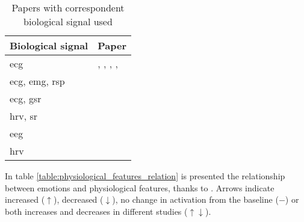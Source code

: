 \begin{table}[h!]
	\centering
	\begin{tabular}{|l|l|}
		\hline
		Biological signal & Paper\\ [0.5ex] 
		\hline \hline \gls{ecg} & \cite{dissanayake2019ensemble}, \cite{hsu2017automatic},  \cite{naji2014classification}, \cite{naji2015emotion}, \cite{cai2009research}  \\ 
		\hline \gls{ecg}, \gls{emg}, \gls{rsp} & \cite{kim2008emotion} \\
		\hline \gls{ecg}, \gls{gsr} & \cite{goshvarpour2017accurate} \\ 
		\hline \gls{hrv}, \gls{sr} & \cite{yoo2005neural} \\
		\hline \gls{eeg} & \cite{sourina2012real} \\
		\hline \gls{hrv} & \cite{nardelli2015recognizing} \\
		\hline
	\end{tabular}
	\caption{Papers with correspondent biological signal used}
	\label{table:biological_signals}
\end{table}
\newpage
In table \ref{table:physiological_features_relation} is presented the relationship between emotions and physiological features, thanks to \cite{shu2018review}. Arrows indicate increased ($\uparrow$), decreased ($\downarrow$), no change in activation from the baseline ($-$) or both increases and decreases in different studies ($\uparrow\downarrow$).
